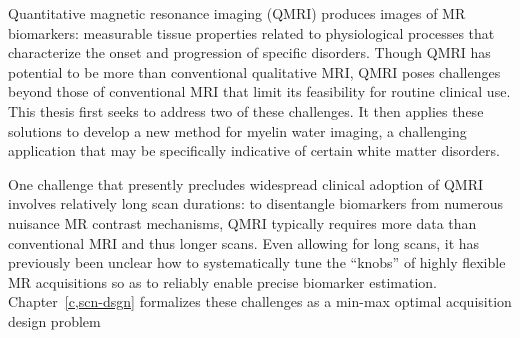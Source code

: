 \setlength{\parindent}{0ex}
Quantitative magnetic resonance imaging (QMRI)
produces images of  MR biomarkers: 
measurable tissue properties
related to physiological processes
that characterize the onset and progression
of specific disorders.
Though QMRI has potential 
to be more  
than conventional qualitative MRI,
QMRI poses challenges 
beyond those of conventional MRI
that limit its feasibility 
for routine clinical use.
This thesis first seeks to address 
two of these challenges.
It then applies these solutions
to develop a new method
for myelin water imaging,
a challenging application 
that may be specifically indicative
of certain white matter disorders. 

\setlength{\parindent}{4ex}
One challenge 
that presently precludes widespread clinical adoption of QMRI
involves relatively long scan durations:
to disentangle  biomarkers
from numerous nuisance MR contrast mechanisms,
QMRI typically requires more data than conventional MRI
and thus longer scans. 
Even allowing for long scans,
it has previously been unclear 
how to systematically tune the ``knobs'' 
of highly flexible MR acquisitions
so as to reliably enable precise biomarker estimation.
Chapter~\ref{c,scn-dsgn} formalizes these challenges
as a min-max optimal acquisition design problem
%

